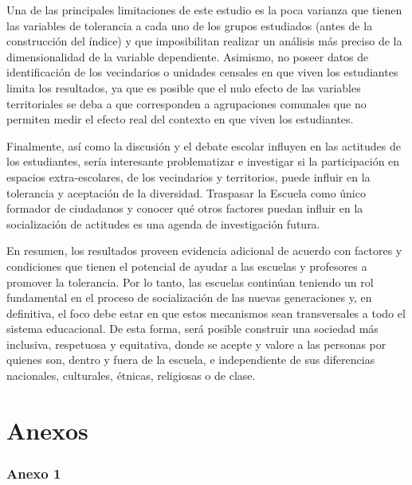 \documentclass[12pt,twoside]{templates/facsothesis}
\begin{document}
Una de las principales limitaciones de este estudio es la poca varianza que tienen las variables de tolerancia a cada uno de los grupos estudiados (antes de la construcción del índice) y que imposibilitan realizar un análisis más preciso de la dimensionalidad de la variable dependiente. Asimismo, no poseer datos de identificación de los vecindarios o unidades censales en que viven los estudiantes limita los resultados, ya que es posible que el nulo efecto de las variables territoriales se deba a que corresponden a agrupaciones comunales que no permiten medir el efecto real del contexto en que viven los estudiantes.

Finalmente, así como la discusión y el debate escolar influyen en las actitudes de los estudiantes, sería interesante problematizar e investigar si la participación en espacios extra-escolares, de los vecindarios y territorios, puede influir en la tolerancia y aceptación de la diversidad. Traspasar la Escuela como único formador de ciudadanos y conocer qué otros factores puedan influir en la socialización de actitudes es una agenda de investigación futura.

En resumen, los resultados proveen evidencia adicional de acuerdo con factores y condiciones que tienen el potencial de ayudar a las escuelas y profesores a promover la tolerancia. Por lo tanto, las escuelas continúan teniendo un rol fundamental en el proceso de socialización de las nuevas generaciones y, en definitiva, el foco debe estar en que estos mecanismos sean transversales a todo el sistema educacional. De esta forma, será posible construir una sociedad más inclusiva, respetuosa y equitativa, donde se acepte y valore a las personas por quienes son, dentro y fuera de la escuela, e independiente de sus diferencias nacionales, culturales, étnicas, religiosas o de clase.

\hypertarget{anexos}{%
\chapter{Anexos}\label{anexos}}

\hypertarget{anexo-1}{%
\subsection{Anexo 1}\label{anexo-1}}
\end{document}
